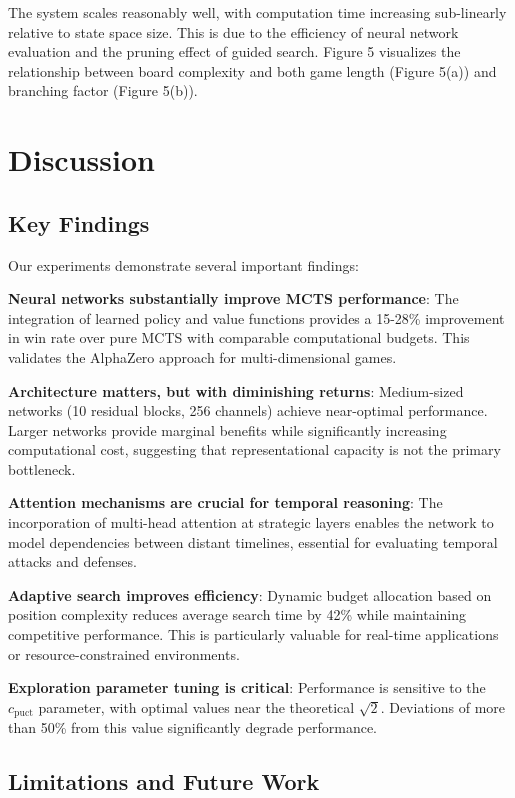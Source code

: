 \documentclass{article}
\begin{document}
The system scales reasonably well, with computation time increasing sub-linearly relative to state space size. This is due to the efficiency of neural network evaluation and the pruning effect of guided search. Figure 5 visualizes the relationship between board complexity and both game length (Figure 5(a)) and branching factor (Figure 5(b)).

\section{Discussion}

\subsection{Key Findings}

Our experiments demonstrate several important findings:

\textbf{Neural networks substantially improve MCTS performance}: The integration of learned policy and value functions provides a 15-28\% improvement in win rate over pure MCTS with comparable computational budgets. This validates the AlphaZero approach for multi-dimensional games.

\textbf{Architecture matters, but with diminishing returns}: Medium-sized networks (10 residual blocks, 256 channels) achieve near-optimal performance. Larger networks provide marginal benefits while significantly increasing computational cost, suggesting that representational capacity is not the primary bottleneck.

\textbf{Attention mechanisms are crucial for temporal reasoning}: The incorporation of multi-head attention at strategic layers enables the network to model dependencies between distant timelines, essential for evaluating temporal attacks and defenses.

\textbf{Adaptive search improves efficiency}: Dynamic budget allocation based on position complexity reduces average search time by 42\% while maintaining competitive performance. This is particularly valuable for real-time applications or resource-constrained environments.

\textbf{Exploration parameter tuning is critical}: Performance is sensitive to the $c_{\text{puct}}$ parameter, with optimal values near the theoretical $\sqrt{2}$. Deviations of more than 50\% from this value significantly degrade performance.

\subsection{Limitations and Future Work}
\end{document}
